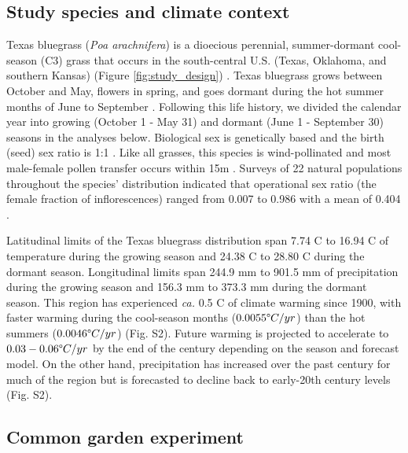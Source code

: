 \documentclass[9pt,twocolumn,twoside,lineno]{pnas-new}
\begin{document}
\subsection*{Study species and climate context}
Texas bluegrass (\textit{Poa arachnifera}) is a dioecious perennial, summer-dormant cool-season (C3) grass that occurs in the south-central U.S. (Texas, Oklahoma, and southern Kansas) (Figure \ref{fig:study_design}) \citep{hitchcock1971manual}. 
Texas bluegrass grows between October and May, flowers in spring, and goes dormant during the hot summer months of June to September \citep{kindiger2004interspecific}. 
Following this life history, we divided the calendar year into growing (October 1 - May 31) and dormant (June 1 - September 30) seasons in the analyses below. 
Biological sex is genetically based and the birth (seed) sex ratio is 1:1 \citep{renganayaki2005identification}. 
Like all grasses, this species is wind-pollinated \citep{hitchcock1971manual} and most male-female pollen transfer occurs within 15m \citep{compagnoni2017can}. 
Surveys of 22 natural populations throughout the species' distribution indicated that operational sex ratio (the female fraction of inflorescences) ranged from 0.007 to 0.986 with a mean of 0.404 \citep{miller2022two}. 

Latitudinal limits of the Texas bluegrass distribution span 7.74 \degree C to 16.94 \degree C of temperature during the growing season and 24.38 \degree C to 28.80 \degree C  during the dormant season. 
Longitudinal limits span 244.9 mm to 901.5 mm of precipitation during the growing season and 156.3 mm to 373.3 mm during the dormant season. 
This region has experienced \textit{ca.} 0.5 \degree C of climate warming since 1900, with faster warming during the cool-season months ($0.0055 \degree C / yr$) than the hot summers ($0.0046\degree C / yr$) (Fig. S2).
Future warming is projected to accelerate to $0.03-0.06\degree C / yr$ by the end of the century depending on the season and forecast model. 
On the other hand, precipitation has increased over the past century for much of the region but is forecasted to decline back to early-20th century levels (Fig. S2).

\subsection*{Common garden experiment}
\end{document}
